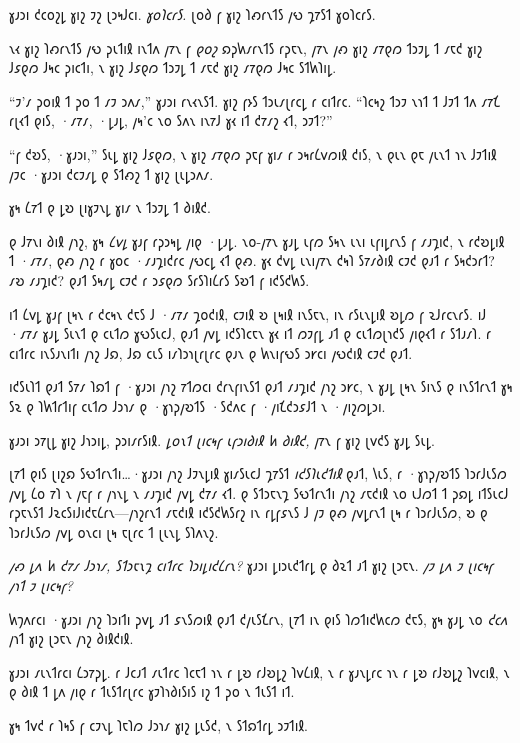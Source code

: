 𐑣𐑨𐑮𐑦 𐑒𐑤𐑴𐑟𐑛 𐑣𐑦𐑟 𐑲𐑟 𐑚𐑮𐑰𐑓𐑤𐑦. \emph{𐑣𐑴𐑐𐑤𐑩𐑕.} 𐑚𐑴𐑔 𐑝 𐑣𐑦𐑟 𐑐𐑺𐑩𐑯𐑑𐑕 𐑢𐑻 𐑡𐑳𐑕𐑑 𐑣𐑴𐑐𐑤𐑩𐑕.

𐑯𐑬 𐑣𐑦𐑟 𐑐𐑺𐑩𐑯𐑑𐑕 𐑢𐑻 𐑜𐑧𐑑𐑦𐑙 𐑦𐑯𐑑𐑵 𐑢𐑳𐑯 𐑝 \emph{𐑞𐑴𐑟} 𐑸𐑜𐑿𐑥𐑩𐑯𐑑𐑕 𐑩𐑜𐑱𐑯, 𐑢𐑳𐑯 𐑢𐑺 𐑣𐑦𐑟 𐑥𐑳𐑞𐑼 𐑑𐑮𐑲𐑛 𐑑 𐑥𐑱𐑒 𐑣𐑦𐑟 𐑓𐑭𐑞𐑼 𐑓𐑰𐑤 𐑜𐑦𐑤𐑑𐑦, 𐑯 𐑣𐑦𐑟 𐑓𐑭𐑞𐑼 𐑑𐑮𐑲𐑛 𐑑 𐑥𐑱𐑒 𐑣𐑦𐑟 𐑥𐑳𐑞𐑼 𐑓𐑰𐑤 𐑕𐑑𐑿𐑐𐑦𐑛.

“𐑲'𐑥 𐑜𐑴𐑦𐑙 𐑑 𐑜𐑴 𐑑 𐑥𐑲 𐑮𐑵𐑥,” 𐑣𐑨𐑮𐑦 𐑩𐑯𐑬𐑯𐑕𐑑. 𐑣𐑦𐑟 𐑝𐑶𐑕 𐑑𐑮𐑧𐑥𐑚𐑩𐑤𐑛 𐑩 𐑤𐑦𐑑𐑩𐑤. “𐑐𐑤𐑰𐑟 𐑑𐑮𐑲 𐑯𐑪𐑑 𐑑 𐑓𐑲𐑑 𐑑𐑵 𐑥𐑳𐑗 𐑩𐑚𐑬𐑑 𐑞𐑦𐑕, ·𐑥𐑳𐑥, ·𐑛𐑨𐑛, 𐑢𐑰'𐑤 𐑯𐑴 𐑕𐑵𐑯 𐑦𐑯𐑳𐑓 𐑣𐑬 𐑦𐑑 𐑒𐑳𐑥𐑟 𐑬𐑑, 𐑮𐑲𐑑?”

“𐑝 𐑒𐑹𐑕, ·𐑣𐑨𐑮𐑦,” 𐑕𐑧𐑛 𐑣𐑦𐑟 𐑓𐑭𐑞𐑼, 𐑯 𐑣𐑦𐑟 𐑥𐑳𐑞𐑼 𐑜𐑱𐑝 𐑣𐑦𐑥 𐑩 𐑮𐑰𐑩𐑖𐑫𐑼𐑦𐑙 𐑒𐑦𐑕, 𐑯 𐑞𐑧𐑯 𐑞𐑱 𐑢𐑧𐑯𐑑 𐑪𐑯 𐑓𐑲𐑑𐑦𐑙 𐑢𐑲𐑤 ·𐑣𐑨𐑮𐑦 𐑒𐑤𐑲𐑥𐑛 𐑞 𐑕𐑑𐑺𐑟 𐑑 𐑣𐑦𐑟 𐑚𐑧𐑛𐑮𐑵𐑥.

𐑣𐑰 𐑖𐑳𐑑 𐑞 𐑛𐑹 𐑚𐑦𐑣𐑲𐑯𐑛 𐑣𐑦𐑥 𐑯 𐑑𐑮𐑲𐑛 𐑑 𐑔𐑦𐑙𐑒.

𐑞 𐑓𐑳𐑯𐑦 𐑔𐑦𐑙 𐑢𐑪𐑟, 𐑣𐑰 \emph{𐑖𐑫𐑛} 𐑣𐑨𐑝 𐑩𐑜𐑮𐑰𐑛 𐑢𐑦𐑞 ·𐑛𐑨𐑛. 𐑯𐑴-𐑢𐑳𐑯 𐑣𐑨𐑛 𐑧𐑝𐑼 𐑕𐑰𐑯 𐑧𐑯𐑦 𐑧𐑝𐑦𐑛𐑩𐑯𐑕 𐑝 𐑥𐑨𐑡𐑦𐑒, 𐑯 𐑩𐑒𐑹𐑛𐑦𐑙 𐑑 ·𐑥𐑳𐑥, 𐑞𐑺 𐑢𐑪𐑟 𐑩 𐑣𐑴𐑤 ·𐑥𐑨𐑡𐑦𐑒𐑩𐑤 𐑢𐑻𐑤𐑛 𐑬𐑑 𐑞𐑺. 𐑣𐑬 𐑒𐑫𐑛 𐑧𐑯𐑦𐑢𐑳𐑯 𐑒𐑰𐑐 𐑕𐑳𐑥𐑔𐑦𐑙 𐑤𐑲𐑒 𐑞𐑨𐑑 𐑩 𐑕𐑰𐑒𐑮𐑩𐑑? 𐑥𐑹 𐑥𐑨𐑡𐑦𐑒? 𐑞𐑨𐑑 𐑕𐑰𐑥𐑛 𐑤𐑲𐑒 𐑩 𐑮𐑭𐑞𐑼 𐑕𐑩𐑕𐑐𐑦𐑖𐑩𐑕 𐑕𐑹𐑑 𐑝 𐑦𐑒𐑕𐑒𐑿𐑕.

𐑦𐑑 𐑖𐑫𐑛 𐑣𐑨𐑝 𐑚𐑰𐑯 𐑩 𐑒𐑤𐑰𐑯 𐑒𐑱𐑕 𐑓 ·𐑥𐑳𐑥 𐑡𐑴𐑒𐑦𐑙, 𐑤𐑲𐑦𐑙 𐑹 𐑚𐑰𐑦𐑙 𐑦𐑯𐑕𐑱𐑯, 𐑦𐑯 𐑩𐑕𐑧𐑯𐑛𐑦𐑙 𐑹𐑛𐑼 𐑝 𐑷𐑓𐑩𐑤𐑯𐑩𐑕. 𐑦𐑓 ·𐑥𐑳𐑥 𐑣𐑨𐑛 𐑕𐑧𐑯𐑑 𐑞 𐑤𐑧𐑑𐑼 𐑣𐑻𐑕𐑧𐑤𐑓, 𐑞𐑨𐑑 𐑢𐑫𐑛 𐑦𐑒𐑕𐑐𐑤𐑱𐑯 𐑣𐑬 𐑦𐑑 𐑼𐑲𐑝𐑛 𐑨𐑑 𐑞 𐑤𐑧𐑑𐑼𐑚𐑪𐑒𐑕 𐑢𐑦𐑞𐑬𐑑 𐑩 𐑕𐑑𐑨𐑥𐑐. 𐑩 𐑤𐑦𐑑𐑩𐑤 𐑦𐑯𐑕𐑨𐑯𐑦𐑑𐑦 𐑢𐑪𐑟 𐑓𐑸, 𐑓𐑸 𐑤𐑧𐑕 𐑦𐑥𐑐𐑮𐑪𐑚𐑩𐑚𐑩𐑤 𐑞𐑨𐑯 𐑞 𐑿𐑯𐑦𐑝𐑻𐑕 𐑮𐑾𐑤𐑦 𐑢𐑻𐑒𐑦𐑙 𐑤𐑲𐑒 𐑞𐑨𐑑.

𐑦𐑒𐑕𐑧𐑐𐑑 𐑞𐑨𐑑 𐑕𐑳𐑥 𐑐𐑸𐑑 𐑝 ·𐑣𐑨𐑮𐑦 𐑢𐑪𐑟 𐑳𐑑𐑼𐑤𐑦 𐑒𐑩𐑯𐑝𐑦𐑯𐑕𐑑 𐑞𐑨𐑑 𐑥𐑨𐑡𐑦𐑒 𐑢𐑪𐑟 𐑮𐑾𐑤, 𐑯 𐑣𐑨𐑛 𐑚𐑰𐑯 𐑕𐑦𐑯𐑕 𐑞 𐑦𐑯𐑕𐑑𐑩𐑯𐑑 𐑣𐑰 𐑕𐑷 𐑞 𐑐𐑿𐑑𐑩𐑑𐑦𐑝 𐑤𐑧𐑑𐑼 𐑓𐑮𐑪𐑥 𐑞 ·𐑣𐑪𐑜𐑢𐑹𐑑𐑕 ·𐑕𐑒𐑵𐑤 𐑝 ·𐑢𐑦𐑗𐑒𐑮𐑭𐑓𐑑 𐑯 ·𐑢𐑦𐑟𐑼𐑛𐑮𐑦.

𐑣𐑨𐑮𐑦 𐑮𐑳𐑚𐑛 𐑣𐑦𐑟 𐑓𐑪𐑮𐑦𐑛, 𐑜𐑮𐑦𐑥𐑩𐑕𐑦𐑙. \emph{𐑛𐑴𐑯𐑑 𐑚𐑦𐑤𐑰𐑝 𐑧𐑝𐑮𐑦𐑔𐑦𐑙 𐑿 𐑔𐑦𐑙𐑒,} 𐑢𐑳𐑯 𐑝 𐑣𐑦𐑟 𐑚𐑫𐑒𐑕 𐑣𐑨𐑛 𐑕𐑧𐑛.

𐑚𐑳𐑑 𐑞𐑦𐑕 𐑚𐑦𐑟𐑸 𐑕𐑻𐑑𐑩𐑯𐑑𐑦…·𐑣𐑨𐑮𐑦 𐑢𐑪𐑟 𐑓𐑲𐑯𐑛𐑦𐑙 𐑣𐑦𐑥𐑕𐑧𐑤𐑓 𐑡𐑳𐑕𐑑 \emph{𐑦𐑒𐑕𐑐𐑧𐑒𐑑𐑦𐑙} 𐑞𐑨𐑑, 𐑘𐑧𐑕, 𐑩 ·𐑣𐑪𐑜𐑢𐑹𐑑𐑕 𐑐𐑮𐑩𐑓𐑧𐑕𐑼 𐑢𐑫𐑛 𐑖𐑴 𐑳𐑐 𐑯 𐑢𐑱𐑝 𐑩 𐑢𐑪𐑯𐑛 𐑯 𐑥𐑨𐑡𐑦𐑒 𐑢𐑫𐑛 𐑒𐑳𐑥 𐑬𐑑. 𐑞 𐑕𐑑𐑮𐑱𐑯𐑡 𐑕𐑻𐑑𐑩𐑯𐑑𐑦 𐑢𐑪𐑟 𐑥𐑱𐑒𐑦𐑙 𐑯𐑴 𐑧𐑓𐑼𐑑 𐑑 𐑜𐑸𐑛 𐑦𐑑𐑕𐑧𐑤𐑓 𐑩𐑜𐑱𐑯𐑕𐑑 𐑓𐑷𐑤𐑕𐑦𐑓𐑦𐑒𐑱𐑖𐑩𐑯—𐑢𐑪𐑟𐑩𐑯𐑑 𐑥𐑱𐑒𐑦𐑙 𐑦𐑒𐑕𐑒𐑿𐑕𐑩𐑟 𐑦𐑯 𐑩𐑛𐑝𐑭𐑯𐑕 𐑓 𐑢𐑲 𐑞𐑺 𐑢𐑫𐑛𐑩𐑯𐑑 𐑚𐑰 𐑩 𐑐𐑮𐑩𐑓𐑧𐑕𐑼, 𐑹 𐑞 𐑐𐑮𐑩𐑓𐑧𐑕𐑼 𐑢𐑫𐑛 𐑴𐑯𐑤𐑦 𐑚𐑰 𐑱𐑚𐑩𐑤 𐑑 𐑚𐑧𐑯𐑛 𐑕𐑐𐑵𐑯𐑟.

\emph{𐑢𐑺 𐑛𐑵 𐑿 𐑒𐑳𐑥 𐑓𐑮𐑪𐑥, 𐑕𐑑𐑮𐑱𐑯𐑡 𐑤𐑦𐑑𐑩𐑤 𐑐𐑮𐑦𐑛𐑦𐑒𐑖𐑩𐑯?} 𐑣𐑨𐑮𐑦 𐑛𐑦𐑮𐑧𐑒𐑑𐑩𐑛 𐑞 𐑔𐑷𐑑 𐑨𐑑 𐑣𐑦𐑟 𐑚𐑮𐑱𐑯. \emph{𐑢𐑲 𐑛𐑵 𐑲 𐑚𐑦𐑤𐑰𐑝 𐑢𐑪𐑑 𐑲 𐑚𐑦𐑤𐑰𐑝?}

𐑿𐑠𐑵𐑩𐑤𐑦 ·𐑣𐑨𐑮𐑦 𐑢𐑪𐑟 𐑐𐑮𐑦𐑑𐑦 𐑜𐑫𐑛 𐑨𐑑 𐑭𐑯𐑕𐑼𐑦𐑙 𐑞𐑨𐑑 𐑒𐑢𐑧𐑕𐑗𐑩𐑯, 𐑚𐑳𐑑 𐑦𐑯 𐑞𐑦𐑕 𐑐𐑼𐑑𐑦𐑒𐑿𐑤𐑼 𐑒𐑱𐑕, 𐑣𐑰 𐑣𐑨𐑛 𐑯𐑴 \emph{𐑒𐑤𐑵} 𐑢𐑪𐑑 𐑣𐑦𐑟 𐑚𐑮𐑱𐑯 𐑢𐑪𐑟 𐑔𐑦𐑙𐑒𐑦𐑙.

𐑣𐑨𐑮𐑦 𐑥𐑧𐑯𐑑𐑩𐑤𐑦 𐑖𐑮𐑳𐑜𐑛. 𐑩 𐑓𐑤𐑨𐑑 𐑥𐑧𐑑𐑩𐑤 𐑐𐑤𐑱𐑑 𐑪𐑯 𐑩 𐑛𐑹 𐑩𐑓𐑹𐑛𐑟 𐑐𐑫𐑖𐑦𐑙, 𐑯 𐑩 𐑣𐑨𐑯𐑛𐑩𐑤 𐑪𐑯 𐑩 𐑛𐑹 𐑩𐑓𐑹𐑛𐑟 𐑐𐑫𐑤𐑦𐑙, 𐑯 𐑞 𐑔𐑦𐑙 𐑑 𐑛𐑵 𐑢𐑦𐑞 𐑩 𐑑𐑧𐑕𐑑𐑩𐑚𐑩𐑤 𐑣𐑲𐑐𐑪𐑔𐑦𐑕𐑦𐑕 𐑦𐑟 𐑑 𐑜𐑴 𐑯 𐑑𐑧𐑕𐑑 𐑦𐑑.

𐑣𐑰 𐑑𐑫𐑒 𐑩 𐑐𐑰𐑕 𐑝 𐑤𐑲𐑯𐑛 𐑐𐑱𐑐𐑼 𐑓𐑮𐑪𐑥 𐑣𐑦𐑟 𐑛𐑧𐑕𐑒, 𐑯 𐑕𐑑𐑸𐑑𐑩𐑛 𐑮𐑲𐑑𐑦𐑙.

\begin{writtenNote}
\end{writtenNote}

